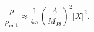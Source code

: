 \begin{equation}\label{eq:ratio}
\frac{\rho}{\rho_\mathrm{crit}}\approx \frac{1}{4\pi}
\left(\frac{\Lambda}{M_{Pl}}\right)^2|X|^2 .
\end{equation}

